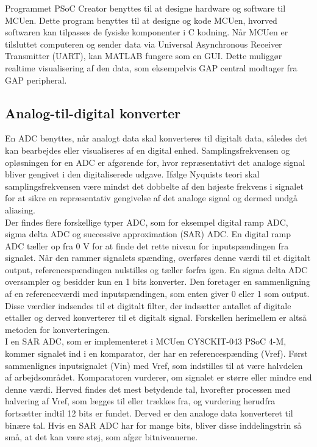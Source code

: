Programmet PSoC Creator benyttes til at designe hardware og software til MCUen. Dette program benyttes til at designe og kode MCUen, hvorved softwaren kan tilpasses de fysiske komponenter i C kodning. \citep{Semiconductor2016} Når MCUen er tilsluttet computeren og sender data via Universal Asynchronous Receiver Transmitter (UART), kan MATLAB fungere som en GUI. Dette muliggør realtime visualisering af den data, som eksempelvis GAP central modtager fra GAP peripheral. \citep{Semiconductor2016,Sparkfun2016}

\subsection{Analog-til-digital konverter}
En ADC benyttes, når analogt data skal konverteres til digitalt data, således det kan bearbejdes eller visualiseres af en digital enhed. Samplingsfrekvensen og opløsningen for en ADC er afgørende for, hvor repræsentativt det analoge signal bliver gengivet i den digitaliserede udgave. Ifølge Nyquists teori skal samplingsfrekvensen være mindst det dobbelte af den højeste frekvens i signalet for at sikre en repræsentativ gengivelse af det analoge signal og dermed undgå aliasing. \citep{Webster2011} \\
Der findes flere forskellige typer ADC, som for eksempel digital ramp ADC, sigma delta ADC og successive approximation (SAR) ADC. En digital ramp ADC tæller op fra 0 V for at finde det rette niveau for inputspændingen fra signalet. Når den rammer signalets spænding, overføres denne værdi til et digitalt output, referencespændingen nulstilles og tæller forfra igen. En sigma delta ADC oversampler og besidder kun en 1 bits konverter. Den foretager en sammenligning af en referenceværdi med inputspændingen, som enten giver 0 eller 1 som output. Disse værdier indsendes til et digitalt filter, der indsætter antallet af digitale ettaller og derved konverterer til et digitalt signal. Forskellen herimellem er altså metoden for konverteringen.~\citep{Moore2004,Sheingold2014} \\
I en SAR ADC, som er implementeret i MCUen CY8CKIT-043 PSoC 4-M, kommer signalet ind i en komparator, der har en referencespænding (Vref). Først sammenlignes inputsignalet (Vin) med Vref, som indstilles til at være halvdelen af arbejdsområdet. Komparatoren vurderer, om signalet er større eller mindre end denne værdi. Herved findes det mest betydende tal, hvorefter processen med halvering af Vref, som lægges til eller trækkes fra, og vurdering herudfra fortsætter indtil 12 bits er fundet. Derved er den analoge data konverteret til binære tal. Hvis en SAR ADC har for mange bits, bliver disse inddelingstrin så små, at det kan være støj, som afgør bitniveauerne. \citep{Moore2004,Sheingold2014} \\
